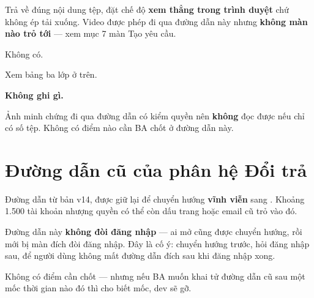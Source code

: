 \mhien

Trả về đúng nội dung tệp, đặt chế độ \textbf{xem thẳng trong trình duyệt} chứ không ép tải
xuống. Video được phép đi qua đường dẫn này nhưng \textbf{không màn nào trỏ tới} --- xem mục 7
màn Tạo yêu cầu.

\mloc

Không có.


Xem bảng ba lớp ở trên.

\mghi

\textbf{Không ghi gì.}

\mhoi

\begin{ask}
Ảnh minh chứng đi qua đường dẫn có kiểm quyền nên \textbf{không} đọc được nếu chỉ có số tệp.
Không có điểm nào cần BA chốt ở đường dẫn này.
\end{ask}

\section{Đường dẫn cũ của phân hệ Đổi trả}
\medskip

Đường dẫn từ bản v14, được giữ lại để chuyển hướng \textbf{vĩnh viễn} sang .
Khoảng 1.500 tài khoản nhượng quyền có thể còn dấu trang hoặc email cũ trỏ vào đó.

Đường dẫn này \textbf{không đòi đăng nhập} --- ai mở cũng được chuyển hướng, rồi mới bị màn
đích đòi đăng nhập. Đây là cố ý: chuyển hướng trước, hỏi đăng nhập sau, để người dùng không
mất đường dẫn đích sau khi đăng nhập xong.

\begin{ask}
Không có điểm cần chốt --- nhưng nếu BA muốn khai tử đường dẫn cũ sau một mốc thời gian nào đó
thì cho biết mốc, dev sẽ gỡ.
\end{ask}
